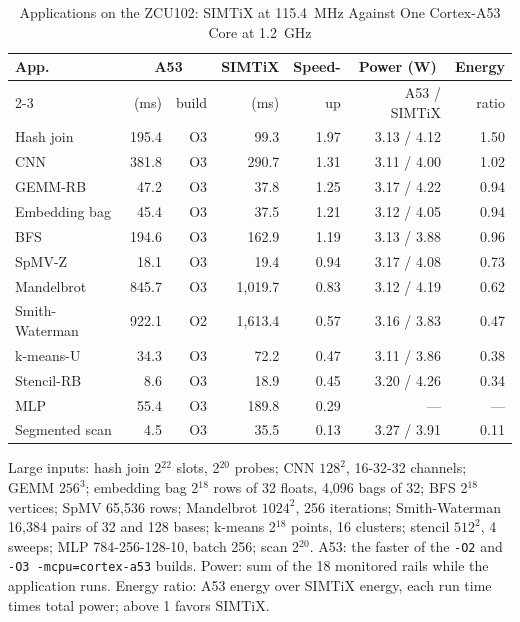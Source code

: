 \documentclass[journal]{IEEEtran}
\begin{document}
\begin{table}[t]
\caption{Applications on the ZCU102: SIMTiX at 115.4~MHz Against One Cortex-A53
Core at 1.2~GHz}
\label{tab:board}
\centering\footnotesize
\setlength{\tabcolsep}{2.2pt}
\begin{tabular}{lrrrrrr}
\toprule
App. & \multicolumn{2}{c}{A53} & SIMTiX & Speed- & \multicolumn{1}{c}{Power (W)} & Energy\\
\cmidrule(lr){2-3}
 & (ms) & build & (ms) & up & A53 / SIMTiX & ratio\\
\midrule
Hash join       & 195.4   & O3 & 99.3    & 1.97 & 3.13 / 4.12 & 1.50\\
CNN             & 381.8   & O3 & 290.7   & 1.31 & 3.11 / 4.00 & 1.02\\
GEMM-RB         & 47.2    & O3 & 37.8    & 1.25 & 3.17 / 4.22 & 0.94\\
Embedding bag   & 45.4    & O3 & 37.5    & 1.21 & 3.12 / 4.05 & 0.94\\
BFS             & 194.6   & O3 & 162.9   & 1.19 & 3.13 / 3.88 & 0.96\\
SpMV-Z          & 18.1    & O3 & 19.4    & 0.94 & 3.17 / 4.08 & 0.73\\
Mandelbrot      & 845.7   & O3 & 1,019.7 & 0.83 & 3.12 / 4.19 & 0.62\\
Smith-Waterman  & 922.1   & O2 & 1,613.4 & 0.57 & 3.16 / 3.83 & 0.47\\
k-means-U       & 34.3    & O3 & 72.2    & 0.47 & 3.11 / 3.86 & 0.38\\
Stencil-RB      & 8.6     & O3 & 18.9    & 0.45 & 3.20 / 4.26 & 0.34\\
MLP             & 55.4    & O3 & 189.8   & 0.29 & --- & ---\\
Segmented scan  & 4.5     & O3 & 35.5    & 0.13 & 3.27 / 3.91 & 0.11\\
\bottomrule
\end{tabular}

\vspace{2pt}
\begin{minipage}{\columnwidth}\footnotesize
Large inputs: hash join 2$^{22}$ slots, 2$^{20}$ probes; CNN $128^2$, 16-32-32
channels; GEMM $256^3$; embedding bag 2$^{18}$ rows of 32 floats, 4,096 bags of 32;
BFS 2$^{18}$ vertices; SpMV 65,536 rows; Mandelbrot $1024^2$, 256 iterations;
Smith-Waterman 16,384 pairs of 32 and 128 bases; k-means 2$^{18}$ points, 16
clusters; stencil $512^2$, 4 sweeps; MLP 784-256-128-10, batch 256; scan 2$^{20}$.
A53: the faster of the \texttt{-O2} and \texttt{-O3 -mcpu=cortex-a53} builds.
Power: sum of the 18 monitored rails while the application runs. Energy ratio: A53
energy over SIMTiX energy, each run time times total power; above 1 favors SIMTiX.
\end{minipage}
\end{table}
\end{document}
